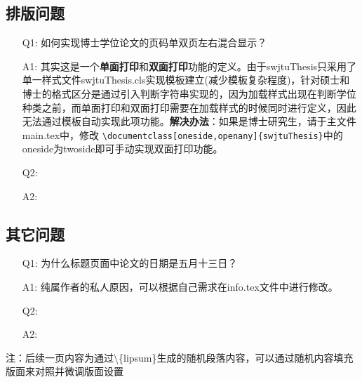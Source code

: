 \subsection{排版问题}
\begin{enumerate}
	\item[Q1:]如何实现博士学位论文的页码单双页左右混合显示？
	\item[A1:]其实这是一个\textbf{单面打印}和\textbf{双面打印}功能的定义。由于swjtuThesis只采用了单一样式文件swjtuThesis.cls实现模板建立(减少模板复杂程度)，针对硕士和博士的格式区分是通过引入判断字符串实现的，因为加载样式出现在判断学位种类之前，而单面打印和双面打印需要在加载样式的时候同时进行定义，因此无法通过模板自动实现此项功能。\textbf{解决办法}：如果是博士研究生，请于主文件main.tex中，修改\newline
\verb|\documentclass[oneside,openany]{swjtuThesis}|中的oneside为twoside即可手动实现双面打印功能。	
	\item[Q2:]
	\item[A2:]
\end{enumerate}

\subsection{其它问题}
\begin{enumerate}
	\item[Q1:]为什么标题页面中论文的日期是五月十三日？
	\item[A1:]纯属作者的私人原因，可以根据自己需求在info.tex文件中进行修改。
	\item[Q2:]
	\item[A2:]
\end{enumerate}

注：后续一页内容为通过\backslash\{lipsum\}生成的随机段落内容，可以通过随机内容填充版面来对照并微调版面设置

\newpage
\lipsum
